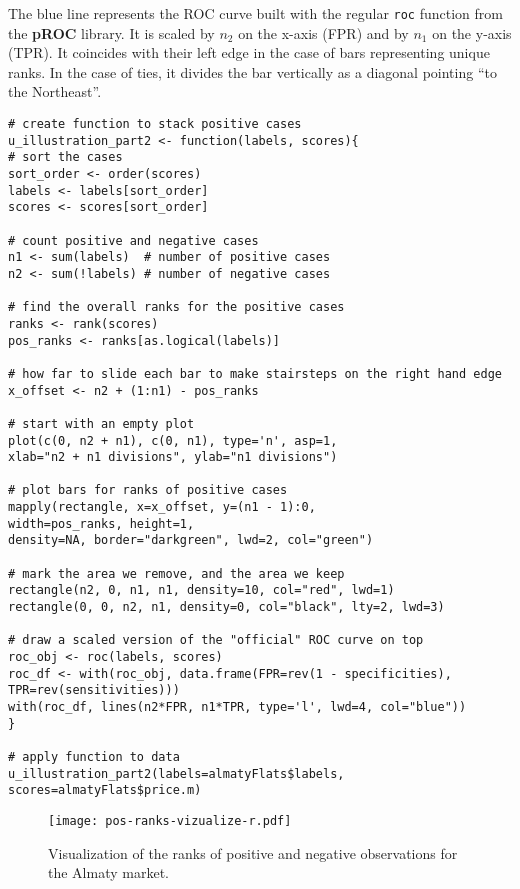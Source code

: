 \documentclass[]{scrreprt}
\begin{document}
The blue line represents the ROC curve built with the regular \texttt{roc} function from the \textbf{pROC} library. It is scaled by $n_{2}$ on the x-axis (FPR) and by $n_{1}$ on the y-axis (TPR). It coincides with their left edge in the case of bars representing unique ranks. In the case of ties, it divides the bar vertically as a diagonal pointing ``to the Northeast''.
%
\begin{lstlisting}[float=htp, caption = Visualization of the ranks of positive and negative observations for the Almaty market, firstnumber=1, label= lst:vizualize-pos-cases-almaty-R]
# create function to stack positive cases
u_illustration_part2 <- function(labels, scores){
# sort the cases
sort_order <- order(scores)
labels <- labels[sort_order]
scores <- scores[sort_order]

# count positive and negative cases
n1 <- sum(labels)  # number of positive cases
n2 <- sum(!labels) # number of negative cases

# find the overall ranks for the positive cases
ranks <- rank(scores)
pos_ranks <- ranks[as.logical(labels)]

# how far to slide each bar to make stairsteps on the right hand edge
x_offset <- n2 + (1:n1) - pos_ranks

# start with an empty plot  
plot(c(0, n2 + n1), c(0, n1), type='n', asp=1,
xlab="n2 + n1 divisions", ylab="n1 divisions")

# plot bars for ranks of positive cases
mapply(rectangle, x=x_offset, y=(n1 - 1):0, 
width=pos_ranks, height=1,
density=NA, border="darkgreen", lwd=2, col="green")

# mark the area we remove, and the area we keep
rectangle(n2, 0, n1, n1, density=10, col="red", lwd=1)
rectangle(0, 0, n2, n1, density=0, col="black", lty=2, lwd=3)

# draw a scaled version of the "official" ROC curve on top
roc_obj <- roc(labels, scores)
roc_df <- with(roc_obj, data.frame(FPR=rev(1 - specificities), 
TPR=rev(sensitivities)))
with(roc_df, lines(n2*FPR, n1*TPR, type='l', lwd=4, col="blue"))
}

# apply function to data
u_illustration_part2(labels=almatyFlats$labels, scores=almatyFlats$price.m)
\end{lstlisting}
%
\begin{figure}[htp]
	\centering
	\texttt{[image: pos-ranks-vizualize-r.pdf]}
	\caption{Visualization of the ranks of positive and negative observations for the Almaty market.}
	\label{fig:pos-ranks-vizualize-r}
\end{figure}
%
\clearpage
%
\end{document}
